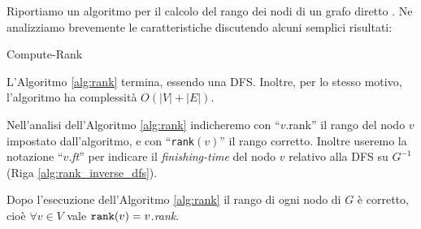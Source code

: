 Riportiamo un algoritmo per il calcolo del rango dei nodi di un grafo diretto \cite{dovier}. Ne analizziamo brevemente le caratteristiche discutendo alcuni semplici risultati:
\begin{algorithm}[t!]
    \caption{Compute-Rank}
    \label{alg:rank}
\end{algorithm}

\begin{observation}
    L'Algoritmo \ref{alg:rank} termina, essendo una DFS. Inoltre, per lo stesso motivo, l'algoritmo ha complessità $O(|V| + |E|)$.
\end{observation}
Nell'analisi dell'Algoritmo \ref{alg:rank} indicheremo con ``$v$.rank'' il rango del nodo $v$ impostato dall'algoritmo, e con ``\texttt{rank}$(v)$'' il rango corretto. Inoltre useremo la notazione ``$v$.\emph{ft}'' per indicare il \emph{finishing-time} del nodo $v$ relativo alla DFS su $G^{-1}$ (Riga \ref{alg:rank_inverse_dfs}).
\begin{theorem}
    \label{theo:rank_correct}
    Dopo l'esecuzione dell'Algoritmo \ref{alg:rank} il rango di ogni nodo di $G$ è corretto, cioè $\forall v \in V$ vale $\verb|rank|(v) = v$.\emph{rank}.
\end{theorem}

